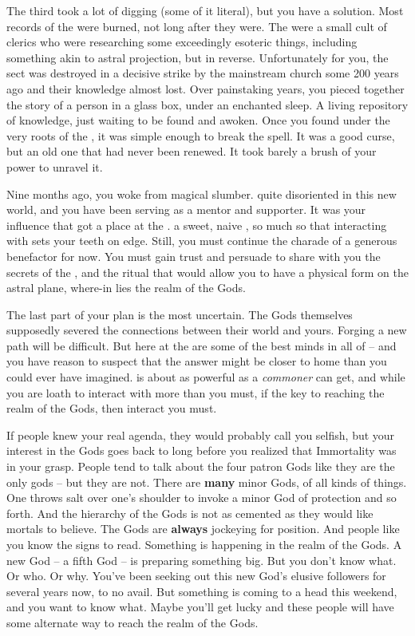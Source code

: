 \documentclass[char]{GL2020}
\begin{document}
The third took a lot of digging (some of it literal), but you have a solution. Most records of the \cDisneySect{} were burned, not long after they were. The \cDisneySect{} were a small cult of \cFarmGod{} clerics who were researching some exceedingly esoteric things, including something akin to astral projection, but in reverse. Unfortunately for you, the sect was destroyed in a decisive strike by the mainstream church some 200 years ago and their knowledge almost lost. Over painstaking years, you pieced together the story of a person in a glass box, under an enchanted sleep. A living repository of knowledge, just waiting to be found and awoken. Once you found \cDisney{\them} under the very roots of the \pSpine{}, it was simple enough to break the spell. It was a good curse, but an old one that had never been renewed. It took barely a brush of your power to unravel it.

Nine months ago, you woke \cDisney{} from \cDisney{\their} magical slumber. \cDisney{\They} \cDisney{\were} quite disoriented in this new world, and you have been serving as a mentor and supporter. It was your influence that got \cDisney{} a place at the \pSchool{}. \cDisney{\They} \cDisney{\are} a sweet, naive \cDisney{\child}, so much so that interacting with \cDisney{\them} sets your teeth on edge. Still, you must continue the charade of a generous benefactor for now. You must gain \cDisney{\their} trust and persuade \cDisney{\them} to share with you the secrets of the \cDisneySect{}, and the ritual that would allow you to have a physical form on the astral plane, where-in lies the realm of the Gods.

The last part of your plan is the most uncertain. The Gods themselves supposedly severed the connections between their world and yours. Forging a new path will be difficult. But here at the \pSc{} are some of the best minds in all of \pEarth{} -- and you have reason to suspect that the answer might be closer to home than you could ever have imagined. \cCurse{} is about as powerful as a \emph{commoner} can get, and while you are loath to interact with \cCurse{\them} more than you must, if \cCurse{\they} \cCurse{\have} the key to reaching the realm of the Gods, then interact you must.

If people knew your real agenda, they would probably call you selfish, but your interest in the Gods goes back to long before you realized that Immortality was in your grasp. People tend to talk about the four patron Gods like they are the only gods -- but they are not. There are \textbf{many} minor Gods, of all kinds of things. One throws salt over one’s shoulder to invoke a minor God of protection and so forth. And the hierarchy of the Gods is not as cemented as they would like mortals to believe. The Gods are \textbf{always} jockeying for position. And people like you know the signs to read. Something is happening in the realm of the Gods. A new God -- a fifth God -- is preparing something big. But you don’t know what. Or who. Or why. You’ve been seeking out this new God’s elusive followers for several years now, to no avail. But something is coming to a head this weekend, and you want to know what. Maybe you’ll get lucky and these people will have some alternate way to reach the realm of the Gods.
\end{document}

